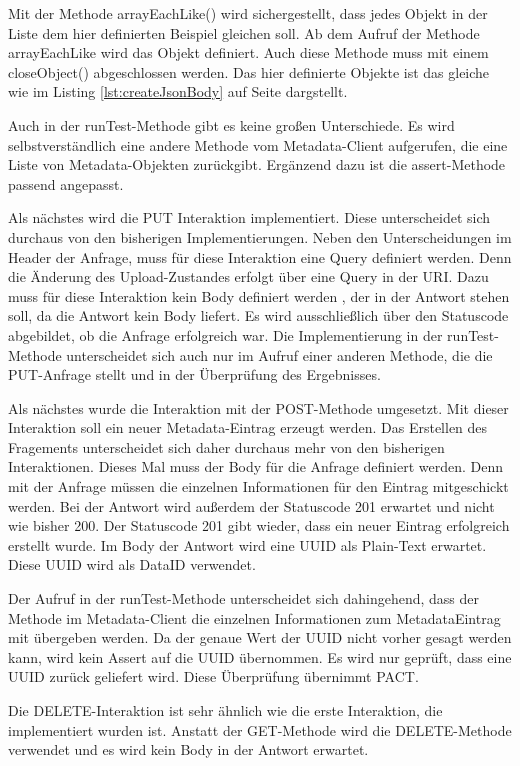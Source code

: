 \documentclass{llncs}
\begin{document}
Mit der Methode arrayEachLike() wird sichergestellt, dass jedes Objekt in der Liste dem hier definierten Beispiel gleichen soll. Ab dem Aufruf der Methode arrayEachLike wird das Objekt definiert. Auch diese Methode muss mit einem closeObject() abgeschlossen werden. Das hier definierte Objekte ist das gleiche wie im Listing \ref{lst:createJsonBody} auf Seite \pageref{lst:createJsonBody} dargstellt.

Auch in der runTest-Methode gibt es keine großen Unterschiede. Es wird selbstverständlich eine andere Methode vom Metadata-Client aufgerufen, die eine Liste von Metadata-Objekten zurückgibt. Ergänzend dazu ist die assert-Methode passend angepasst.

Als nächstes wird die PUT Interaktion implementiert. Diese unterscheidet sich durchaus von den bisherigen Implementierungen. Neben den Unterscheidungen im Header der Anfrage, muss für diese Interaktion eine Query definiert werden. Denn die Änderung des Upload-Zustandes erfolgt über eine Query in der URI. 
Dazu muss für diese Interaktion kein Body definiert werden , der in der Antwort stehen soll, da die Antwort kein Body liefert. Es wird ausschließlich über den Statuscode abgebildet, ob die Anfrage erfolgreich war.
Die Implementierung in der runTest-Methode unterscheidet sich auch nur im Aufruf einer anderen Methode, die die PUT-Anfrage stellt und in der Überprüfung des Ergebnisses.

Als nächstes wurde die Interaktion mit der POST-Methode umgesetzt. Mit dieser Interaktion soll ein neuer Metadata-Eintrag erzeugt werden. Das Erstellen des Fragements unterscheidet sich daher durchaus mehr von den bisherigen Interaktionen. Dieses Mal muss der Body für die Anfrage definiert werden. Denn mit der Anfrage müssen die einzelnen Informationen für den Eintrag mitgeschickt werden. Bei der Antwort wird außerdem der Statuscode 201 erwartet und nicht wie bisher 200. Der Statuscode 201 gibt wieder, dass ein neuer Eintrag erfolgreich erstellt wurde. Im Body der Antwort wird eine UUID als Plain-Text erwartet. Diese UUID wird als DataID verwendet.

Der Aufruf in der runTest-Methode unterscheidet sich dahingehend, dass der Methode im Metadata-Client die einzelnen Informationen zum MetadataEintrag mit übergeben werden. Da der genaue Wert der UUID nicht vorher gesagt werden kann, wird kein Assert auf die UUID übernommen. Es wird nur geprüft, dass eine UUID zurück geliefert wird. Diese Überprüfung übernimmt PACT.

Die DELETE-Interaktion ist sehr ähnlich wie die erste Interaktion, die implementiert wurden ist. Anstatt der GET-Methode wird die DELETE-Methode verwendet und es wird kein Body in der Antwort erwartet.
\end{document}
